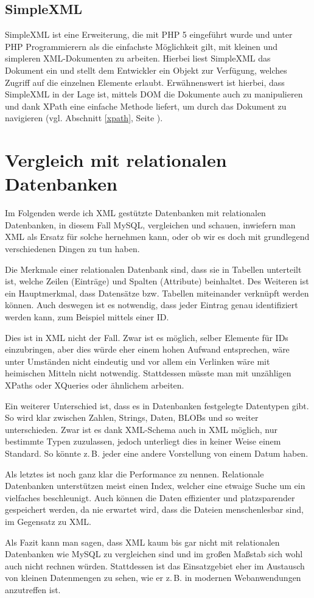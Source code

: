 \subsection{SimpleXML}
SimpleXML ist eine Erweiterung, die mit PHP 5 eingeführt wurde und
unter PHP Programmierern als die einfachste Möglichkeit gilt, mit
kleinen und simpleren XML-Dokumenten zu arbeiten. Hierbei liest
SimpleXML das Dokument ein und stellt dem Entwickler ein Objekt zur
Verfügung, welches Zugriff auf die einzelnen Elemente erlaubt.
Erwähnenswert ist hierbei, dass SimpleXML in der Lage ist, mittels DOM
die Dokumente auch zu manipulieren und dank XPath eine einfache
Methode liefert, um durch das Dokument zu navigieren (vgl. Abschnitt
\ref{xpath}, Seite \pageref{xpath}).

\section{Vergleich mit relationalen Datenbanken}\label{relational_databases}
Im Folgenden werde ich XML gestützte Datenbanken mit relationalen
Datenbanken, in diesem Fall MySQL, vergleichen und schauen, inwiefern
man XML als Ersatz für solche hernehmen kann, oder ob wir es doch mit
grundlegend verschiedenen Dingen zu tun haben.

Die Merkmale einer relationalen Datenbank sind, dass sie in Tabellen
unterteilt ist, welche Zeilen (Einträge) und Spalten (Attribute)
beinhaltet. Des Weiteren ist ein Hauptmerkmal, dass Datensätze bzw.
Tabellen miteinander verknüpft werden können. Auch deswegen ist es
notwendig, dass jeder Eintrag genau identifiziert werden kann, zum
Beispiel mittels einer ID.

Dies ist in XML nicht der Fall. Zwar ist es möglich, selber Elemente
für IDs einzubringen, aber dies würde eher einem hohen Aufwand
entsprechen, wäre unter Umständen nicht eindeutig und vor allem ein
Verlinken wäre mit heimischen Mitteln nicht notwendig. Stattdessen
müsste man mit unzähligen XPaths oder XQueries oder ähnlichem
arbeiten.

Ein weiterer Unterschied ist, dass es in Datenbanken festgelegte
Datentypen gibt. So wird klar zwischen Zahlen, Strings, Daten, BLOBs
und so weiter unterschieden. Zwar ist es dank XML-Schema auch in XML
möglich, nur bestimmte Typen zuzulassen, jedoch unterliegt dies in
keiner Weise einem Standard. So könnte z.\,B. jeder eine andere Vorstellung
von einem Datum haben.

Als letztes ist noch ganz klar die Performance zu nennen. Relationale
Datenbanken unterstützen meist einen Index, welcher eine etwaige Suche
um ein vielfaches beschleunigt. Auch können die Daten effizienter und
platzsparender gespeichert werden, da nie erwartet wird, dass die
Dateien menschenlesbar sind, im Gegensatz zu XML.

Als Fazit kann man sagen, dass XML kaum bis gar nicht mit relationalen
Datenbanken wie MySQL zu vergleichen sind und im großen Maßstab sich
wohl auch nicht rechnen würden. Stattdessen ist das Einsatzgebiet eher
im Austausch von kleinen Datenmengen zu sehen, wie er z.\,B. in
modernen Webanwendungen anzutreffen ist.